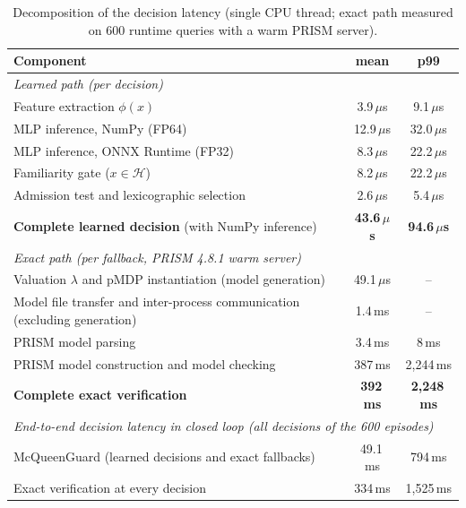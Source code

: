 \documentclass[11pt]{article}
\begin{document}
\begin{table}[h]
\centering\small
\caption{Decomposition of the decision latency (single CPU thread; exact path measured on 600 runtime queries with a warm
PRISM server).}\label{tab:lat}
\begin{tabular}{lcc}
\toprule
Component & mean & p99 \\
\midrule
\multicolumn{3}{l}{\textit{Learned path (per decision)}} \\
Feature extraction $\phi(x)$ & 3.9\,$\mu$s & 9.1\,$\mu$s \\
MLP inference, NumPy (FP64) & 12.9\,$\mu$s & 32.0\,$\mu$s \\
MLP inference, ONNX Runtime (FP32) & 8.3\,$\mu$s & 22.2\,$\mu$s \\
Familiarity gate ($x\in\mathcal{H}$) & 8.2\,$\mu$s & 22.2\,$\mu$s \\
Admission test and lexicographic selection & 2.6\,$\mu$s & 5.4\,$\mu$s \\
\textbf{Complete learned decision} (with NumPy inference) & \textbf{43.6\,$\mu$s} & \textbf{94.6\,$\mu$s} \\
\midrule\multicolumn{3}{l}{\textit{Exact path (per fallback, PRISM 4.8.1 warm server)}} \\
Valuation $\lambda$ and pMDP instantiation (model generation) & 49.1\,$\mu$s & -- \\
Model file transfer and inter-process communication (excluding generation) & 1.4\,ms & -- \\
PRISM model parsing & 3.4\,ms & 8\,ms \\
PRISM model construction and model checking & 387\,ms & 2,244\,ms \\
\textbf{Complete exact verification} & \textbf{392\,ms} & \textbf{2,248\,ms} \\
\midrule\multicolumn{3}{l}{\textit{End-to-end decision latency in closed loop (all decisions of the 600 episodes)}} \\
McQueenGuard (learned decisions and exact fallbacks) & 49.1\,ms & 794\,ms \\
Exact verification at every decision & 334\,ms & 1,525\,ms \\
\bottomrule
\end{tabular}
\end{table}
\end{document}
